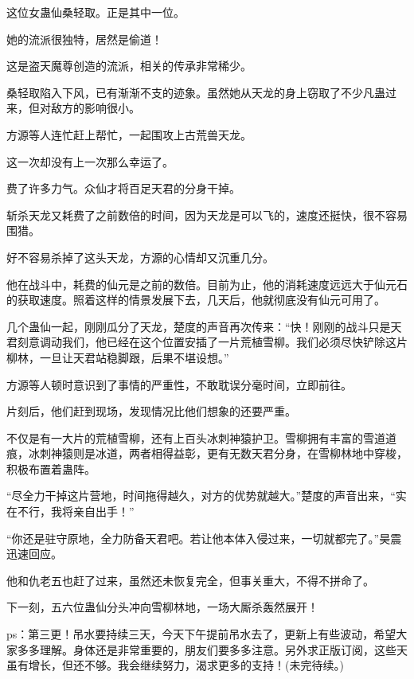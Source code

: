 \begin{this_body}
这位女蛊仙桑轻取。正是其中一位。

她的流派很独特，居然是偷道！

这是盗天魔尊创造的流派，相关的传承非常稀少。

桑轻取陷入下风，已有渐渐不支的迹象。虽然她从天龙的身上窃取了不少凡蛊过来，但对敌方的影响很小。

方源等人连忙赶上帮忙，一起围攻上古荒兽天龙。

这一次却没有上一次那么幸运了。

费了许多力气。众仙才将百足天君的分身干掉。

斩杀天龙又耗费了之前数倍的时间，因为天龙是可以飞的，速度还挺快，很不容易围猎。

好不容易杀掉了这头天龙，方源的心情却又沉重几分。

他在战斗中，耗费的仙元是之前的数倍。目前为止，他的消耗速度远远大于仙元石的获取速度。照着这样的情景发展下去，几天后，他就彻底没有仙元可用了。

几个蛊仙一起，刚刚瓜分了天龙，楚度的声音再次传来：“快！刚刚的战斗只是天君刻意调动我们，他已经在这个位置安插了一片荒植雪柳。我们必须尽快铲除这片柳林，一旦让天君站稳脚跟，后果不堪设想。”

方源等人顿时意识到了事情的严重性，不敢耽误分毫时间，立即前往。

片刻后，他们赶到现场，发现情况比他们想象的还要严重。

不仅是有一大片的荒植雪柳，还有上百头冰刺神猿护卫。雪柳拥有丰富的雪道道痕，冰刺神猿则是冰道，两者相得益彰，更有无数天君分身，在雪柳林地中穿梭，积极布置着蛊阵。

“尽全力干掉这片营地，时间拖得越久，对方的优势就越大。”楚度的声音出来，“实在不行，我将亲自出手！”

“你还是驻守原地，全力防备天君吧。若让他本体入侵过来，一切就都完了。”昊震迅速回应。

他和仇老五也赶了过来，虽然还未恢复完全，但事关重大，不得不拼命了。

下一刻，五六位蛊仙分头冲向雪柳林地，一场大厮杀轰然展开！

ps：第三更！吊水要持续三天，今天下午提前吊水去了，更新上有些波动，希望大家多多理解。身体还是非常重要的，朋友们要多多注意。另外求正版订阅，这些天虽有增长，但还不够。我会继续努力，渴求更多的支持！(未完待续。)

\end{this_body}

